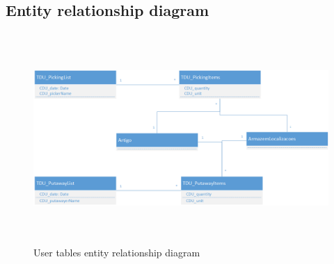 \documentclass[a4paper]{article}
\begin{document}
\subsection{Entity relationship diagram}
\begin{figure}[h!]
\centerline{\includegraphics[height=8cm, width=16cm]{classDiagram.png}}
\caption{User tables entity relationship diagram}
\end{figure}

\newpage
\end{document}
